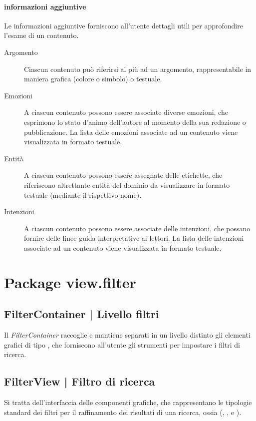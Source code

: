 \documentclass[10pt,a4paper,headinclude,footinclude,hidelinks]{scrreprt} %
\begin{document}
	\paragraph{informazioni aggiuntive} Le informazioni aggiuntive forniscono all'utente dettagli utili per approfondire l'esame di un contenuto.
	\begin{description}
	\item[Argomento] Ciascun contenuto può riferirsi al più ad un argomento, rappresentabile in maniera grafica (colore o simbolo) o testuale.
	\item[Emozioni] A ciascun contenuto possono essere associate diverse emozioni, che esprimono lo stato d'animo dell'autore al momento della sua redazione o pubblicazione. La lista delle emozioni associate ad un contenuto viene visualizzata in formato testuale.
	\item[Entit\`a] A ciascun contenuto possono essere assegnate delle etichette, che riferiscono altrettante entità del dominio da visualizzare in formato testuale (mediante il rispettivo nome).
	\item[Intenzioni] A ciascun contenuto possono essere associate delle intenzioni, che possano fornire delle linee guida interpretative ai lettori. La lista delle intenzioni associate ad un contenuto viene visualizzata in formato testuale.
	\end{description}

	\section{Package view.filter}
	\label{sec:stage:design:sistema:view.filter}

	\subsection[FilterContainer]{FilterContainer | Livello filtri}
	Il \textit{FilterContainer} raccoglie e mantiene separati in un livello distinto gli elementi grafici di tipo \textit{}, che forniscono all'utente gli strumenti per impostare i filtri di ricerca.
	

	\subsection[FilterView]{FilterView | Filtro di ricerca}
	\label{sec:stage:design:sistema:view.filter:filter}
	Si tratta dell'interfaccia delle componenti grafiche, che rappresentano le tipologie standard dei filtri per il raffinamento dei risultati di una ricerca, ossia (\textit{}, \textit{}, \textit{} e \textit{}).
\end{document}
